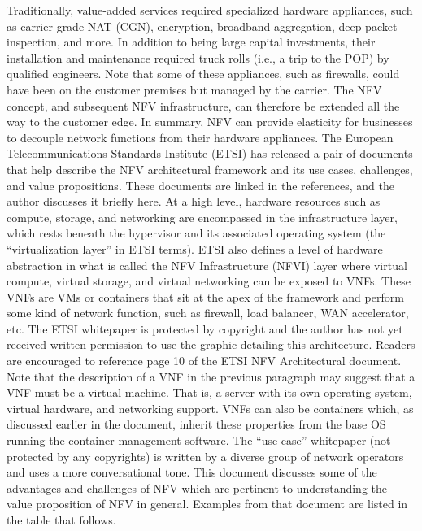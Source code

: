 Traditionally, value-added services required specialized hardware appliances,
such as carrier-grade NAT (CGN), encryption, broadband aggregation, deep
packet inspection, and more. In addition to being large capital investments,
their installation and maintenance required truck rolls (i.e., a trip to the
POP) by qualified engineers. Note that some of these appliances, such as
firewalls, could have been on the customer premises but managed by the
carrier. The NFV concept, and subsequent NFV infrastructure, can therefore be
extended all the way to the customer edge. In summary, NFV can provide
elasticity for businesses to decouple network functions from their hardware
appliances. The European Telecommunications Standards Institute (ETSI) has
released a pair of documents that help describe the NFV architectural
framework and its use cases, challenges, and value propositions. These
documents are linked in the references, and the author discusses it briefly
here. At a high level, hardware resources such as compute, storage, and
networking are encompassed in the infrastructure layer, which rests beneath
the hypervisor and its associated operating system (the ``virtualization layer''
in ETSI terms). ETSI also defines a level of hardware abstraction in what is
called the NFV Infrastructure (NFVI) layer where virtual compute, virtual
storage, and virtual networking can be exposed to VNFs. These VNFs are VMs or
containers that sit at the apex of the framework and perform some kind of
network function, such as firewall, load balancer, WAN accelerator, etc. The
ETSI whitepaper is protected by copyright and the author has not yet received
written permission to use the graphic detailing this architecture. Readers are
encouraged to reference page 10 of the ETSI NFV Architectural document. \\

Note that the description of a VNF in the previous paragraph may suggest that
a VNF must be a virtual machine. That is, a server with its own operating
system, virtual hardware, and networking support. VNFs can also be containers
which, as discussed earlier in the document, inherit these properties from the
base OS running the container management software. The ``use case'' whitepaper
(not protected by any copyrights) is written by a diverse group of network
operators and uses a more conversational tone. This document discusses some of
the advantages and challenges of NFV which are pertinent to understanding the
value proposition of NFV in general. Examples from that document are listed
in the table that follows.

